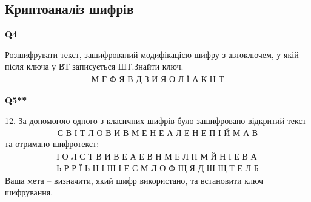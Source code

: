 \documentclass{../../test-template}
\begin{document}
\subsection{Криптоаналіз шифрів}
\begin{tcolorbox}[lowerbox=invisible,colback=white]
    \begin{minipage}{0.1\textwidth}
        \raggedright
        \vspace*{\fill}
            \textbf{Q4}
        \vspace*{\fill}
        \end{minipage}
        \begin{minipage}{0.75\textwidth}
        Розшифрувати текст, зашифрований модифікацією шифру з автоключем, у якій після ключа у ВТ записується ШТ.Знайти ключ.
        \begin{align*}
            \textsf{М Г Ф Я В Д З И Я О Л Ї А К Н Т}
        \end{align*}
        \end{minipage}
\end{tcolorbox}
\begin{tcolorbox}[lowerbox=invisible,colback=white]
    \begin{minipage}{0.1\textwidth}
        \raggedright
        \vspace*{\fill}
            \textbf{Q5**}
        \vspace*{\fill}
        \end{minipage}
        \begin{minipage}{0.75\textwidth}
        12.	За допомогою одного з класичних шифрів було зашифровано відкритий текст
        \begin{align*}
            \textsf{С В І Т Л О В И В М Е Н Е А Л Е Н Е П І Й М А В}
        \end{align*}
        та отримано шифротекст:
        \begin{align*}
            \textsf{І О Л С Т В И В Е А Е В Н М Е Л П М Й Н І Е В А} \\
            \textsf{Ь Р Р Ї Ь Н І Ш І Е С М Л О Ф Щ Я Д Ш Щ Т Е Л Б}
        \end{align*}    
        Ваша мета -- визначити, який шифр використано, та встановити ключ шифрування. 
        \end{minipage}
\end{tcolorbox}
\end{document}
